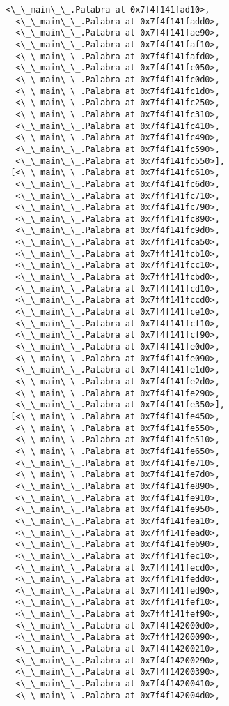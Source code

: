 \documentclass[12pt,a4paper,table]{article}
\begin{document}
\begin{tcolorbox}[breakable, size=fbox, boxrule=.5pt, pad at break*=1mm, opacityfill=0]
\begin{Verbatim}[commandchars=\\\{\}]
  <\_\_main\_\_.Palabra at 0x7f4f141fad10>,
  <\_\_main\_\_.Palabra at 0x7f4f141fadd0>,
  <\_\_main\_\_.Palabra at 0x7f4f141fae90>,
  <\_\_main\_\_.Palabra at 0x7f4f141faf10>,
  <\_\_main\_\_.Palabra at 0x7f4f141fafd0>,
  <\_\_main\_\_.Palabra at 0x7f4f141fc050>,
  <\_\_main\_\_.Palabra at 0x7f4f141fc0d0>,
  <\_\_main\_\_.Palabra at 0x7f4f141fc1d0>,
  <\_\_main\_\_.Palabra at 0x7f4f141fc250>,
  <\_\_main\_\_.Palabra at 0x7f4f141fc310>,
  <\_\_main\_\_.Palabra at 0x7f4f141fc410>,
  <\_\_main\_\_.Palabra at 0x7f4f141fc490>,
  <\_\_main\_\_.Palabra at 0x7f4f141fc590>,
  <\_\_main\_\_.Palabra at 0x7f4f141fc550>],
 [<\_\_main\_\_.Palabra at 0x7f4f141fc610>,
  <\_\_main\_\_.Palabra at 0x7f4f141fc6d0>,
  <\_\_main\_\_.Palabra at 0x7f4f141fc710>,
  <\_\_main\_\_.Palabra at 0x7f4f141fc790>,
  <\_\_main\_\_.Palabra at 0x7f4f141fc890>,
  <\_\_main\_\_.Palabra at 0x7f4f141fc9d0>,
  <\_\_main\_\_.Palabra at 0x7f4f141fca50>,
  <\_\_main\_\_.Palabra at 0x7f4f141fcb10>,
  <\_\_main\_\_.Palabra at 0x7f4f141fcc10>,
  <\_\_main\_\_.Palabra at 0x7f4f141fcbd0>,
  <\_\_main\_\_.Palabra at 0x7f4f141fcd10>,
  <\_\_main\_\_.Palabra at 0x7f4f141fccd0>,
  <\_\_main\_\_.Palabra at 0x7f4f141fce10>,
  <\_\_main\_\_.Palabra at 0x7f4f141fcf10>,
  <\_\_main\_\_.Palabra at 0x7f4f141fcf90>,
  <\_\_main\_\_.Palabra at 0x7f4f141fe0d0>,
  <\_\_main\_\_.Palabra at 0x7f4f141fe090>,
  <\_\_main\_\_.Palabra at 0x7f4f141fe1d0>,
  <\_\_main\_\_.Palabra at 0x7f4f141fe2d0>,
  <\_\_main\_\_.Palabra at 0x7f4f141fe290>,
  <\_\_main\_\_.Palabra at 0x7f4f141fe350>],
 [<\_\_main\_\_.Palabra at 0x7f4f141fe450>,
  <\_\_main\_\_.Palabra at 0x7f4f141fe550>,
  <\_\_main\_\_.Palabra at 0x7f4f141fe510>,
  <\_\_main\_\_.Palabra at 0x7f4f141fe650>,
  <\_\_main\_\_.Palabra at 0x7f4f141fe710>,
  <\_\_main\_\_.Palabra at 0x7f4f141fe7d0>,
  <\_\_main\_\_.Palabra at 0x7f4f141fe890>,
  <\_\_main\_\_.Palabra at 0x7f4f141fe910>,
  <\_\_main\_\_.Palabra at 0x7f4f141fe950>,
  <\_\_main\_\_.Palabra at 0x7f4f141fea10>,
  <\_\_main\_\_.Palabra at 0x7f4f141fead0>,
  <\_\_main\_\_.Palabra at 0x7f4f141feb90>,
  <\_\_main\_\_.Palabra at 0x7f4f141fec10>,
  <\_\_main\_\_.Palabra at 0x7f4f141fecd0>,
  <\_\_main\_\_.Palabra at 0x7f4f141fedd0>,
  <\_\_main\_\_.Palabra at 0x7f4f141fed90>,
  <\_\_main\_\_.Palabra at 0x7f4f141fef10>,
  <\_\_main\_\_.Palabra at 0x7f4f141fef90>,
  <\_\_main\_\_.Palabra at 0x7f4f142000d0>,
  <\_\_main\_\_.Palabra at 0x7f4f14200090>,
  <\_\_main\_\_.Palabra at 0x7f4f14200210>,
  <\_\_main\_\_.Palabra at 0x7f4f14200290>,
  <\_\_main\_\_.Palabra at 0x7f4f14200390>,
  <\_\_main\_\_.Palabra at 0x7f4f14200410>,
  <\_\_main\_\_.Palabra at 0x7f4f142004d0>,

\end{Verbatim}
\end{tcolorbox}
\end{document}
